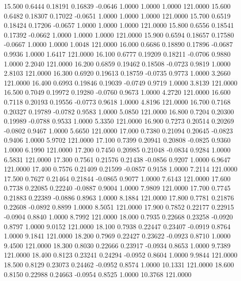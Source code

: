   15.500   0.6444   0.18191   0.16839  -0.0646   1.0000   1.0000   1.0000 121.0000
  15.600   0.6482   0.18307   0.17022  -0.0651   1.0000   1.0000   1.0000 121.0000
  15.700   0.6519   0.18424   0.17206  -0.0657   1.0000   1.0000   1.0000 121.0000
  15.800   0.6556   0.18541   0.17392  -0.0662   1.0000   1.0000   1.0000 121.0000
  15.900   0.6594   0.18657   0.17580  -0.0667   1.0000   1.0000   1.0048 121.0000
  16.000   0.6686   0.18890   0.17896  -0.0687   0.9936   1.0000   1.6417 121.0000
  16.100   0.6777   0.19209   0.18211  -0.0706   0.9880   1.0000   2.2040 121.0000
  16.200   0.6859   0.19462   0.18508  -0.0723   0.9819   1.0000   2.8103 121.0000
  16.300   0.6920   0.19613   0.18759  -0.0735   0.9773   1.0000   3.2660 121.0000
  16.400   0.6993   0.19846   0.19039  -0.0749   0.9719   1.0000   3.8139 121.0000
  16.500   0.7049   0.19972   0.19280  -0.0760   0.9673   1.0000   4.2720 121.0000
  16.600   0.7118   0.20193   0.19556  -0.0773   0.9618   1.0000   4.8196 121.0000
  16.700   0.7168   0.20327   0.19789  -0.0782   0.9583   1.0000   5.0850 121.0000
  16.800   0.7204   0.20300   0.19989  -0.0788   0.9533   1.0000   5.3350 121.0000
  16.900   0.7273   0.20514   0.20269  -0.0802   0.9467   1.0000   5.6650 121.0000
  17.000   0.7380   0.21094   0.20645  -0.0823   0.9406   1.0000   5.9702 121.0000
  17.100   0.7399   0.20941   0.20808  -0.0825   0.9360   1.0000   6.1990 121.0000
  17.200   0.7450   0.20985   0.21048  -0.0834   0.9284   1.0000   6.5831 121.0000
  17.300   0.7561   0.21576   0.21438  -0.0856   0.9207   1.0000   6.9647 121.0000
  17.400   0.7576   0.21409   0.21599  -0.0857   0.9158   1.0000   7.2114 121.0000
  17.500   0.7627   0.21464   0.21844  -0.0865   0.9077   1.0000   7.6143 121.0000
  17.600   0.7738   0.22085   0.22240  -0.0887   0.9004   1.0000   7.9809 121.0000
  17.700   0.7745   0.21883   0.22389  -0.0886   0.8963   1.0000   8.1884 121.0000
  17.800   0.7781   0.21876   0.22608  -0.0892   0.8899   1.0000   8.5051 121.0000
  17.900   0.7852   0.22177   0.22915  -0.0904   0.8840   1.0000   8.7992 121.0000
  18.000   0.7935   0.22668   0.23258  -0.0920   0.8797   1.0000   9.0152 121.0000
  18.100   0.7938   0.22447   0.23407  -0.0919   0.8764   1.0000   9.1841 121.0000
  18.200   0.7969   0.22427   0.23622  -0.0923   0.8710   1.0000   9.4500 121.0000
  18.300   0.8030   0.22666   0.23917  -0.0934   0.8653   1.0000   9.7389 121.0000
  18.400   0.8123   0.23241   0.24294  -0.0952   0.8604   1.0000   9.9844 121.0000
  18.500   0.8129   0.23073   0.24462  -0.0952   0.8574   1.0000  10.1331 121.0000
  18.600   0.8150   0.22988   0.24663  -0.0954   0.8525   1.0000  10.3768 121.0000
